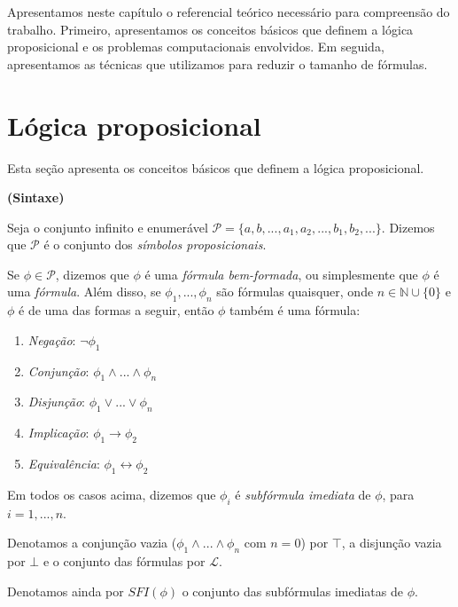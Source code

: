 
\label{cap_referencial}

\indent

Apresentamos neste capítulo o referencial teórico necessário para compreensão do trabalho. Primeiro, apresentamos os conceitos básicos que definem a lógica proposicional e os problemas computacionais envolvidos. Em seguida, apresentamos as técnicas que utilizamos para reduzir o tamanho de fórmulas.

\section{Lógica proposicional}

\indent

Esta seção apresenta os conceitos básicos que definem a lógica proposicional.

\begin{definition}\textbf{(Sintaxe)}
	
	Seja o conjunto infinito e enumerável $\mathcal{P} = \{a,b,...,a_1,a_2,...,b_1,b_2,...\}$. Dizemos que $\mathcal{P}$ é o conjunto dos \emph{símbolos proposicionais}.
	
    Se $\phi \in \mathcal{P}$, dizemos que $\phi$ é uma \emph{fórmula bem-formada}, ou simplesmente que $\phi$ é uma \emph{fórmula}. Além disso, se $\phi_1,...,\phi_n$ são fórmulas quaisquer, onde $n \in \mathbb{N} \cup \{0\}$ e $\phi$ é de uma das formas a seguir, então $\phi$ também é uma fórmula:
    \begin{enumerate}
        \item \emph{Negação}: $\neg \phi_1$
        \item \emph{Conjunção}: $\phi_1 \wedge ... \wedge \phi_n$
        \item \emph{Disjunção}: $\phi_1 \vee ... \vee \phi_n$
        \item \emph{Implicação}: $\phi_1 \rightarrow \phi_2$
        \item \emph{Equivalência}: $\phi_1 \leftrightarrow \phi_2$
    \end{enumerate}
    Em todos os casos acima, dizemos que $\phi_i$ é \emph{subfórmula imediata} de $\phi$, para $i=1,...,n$.
    
    Denotamos a conjunção vazia ($\phi_1 \wedge ... \wedge \phi_n$ com $n=0$) por $\top$, a disjunção vazia por $\bot$ e o conjunto das fórmulas por $\mathcal{L}$.
    
    Denotamos ainda por $SFI(\phi)$ o conjunto das subfórmulas imediatas de $\phi$.
\end{definition}


